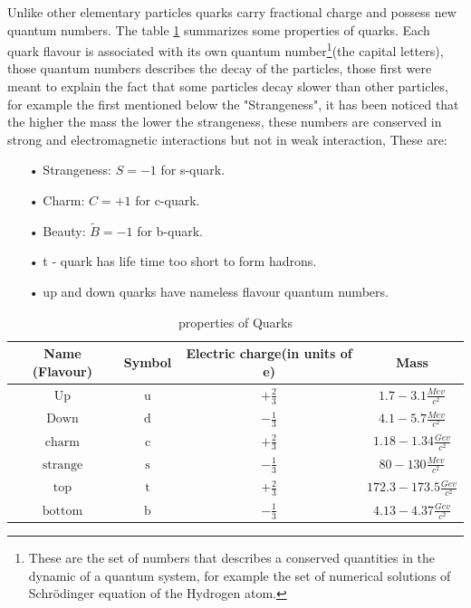 Unlike other elementary particles quarks carry fractional charge and possess new quantum numbers.
The table \ref{table1.1} summarizes
some properties of quarks.
Each quark flavour is associated with its own quantum number\footnote{These are the set of numbers that describes a conserved quantities in the dynamic of a quantum system, for example the set of numerical solutions of Schrödinger equation of the Hydrogen atom.}(the capital letters), those quantum numbers describes the decay of the particles, those first were meant to explain the fact that some particles decay slower than other particles, for example the first mentioned below the "Strangeness", it has been noticed that the higher the mass the lower the strangeness,  these numbers are conserved in strong and electromagnetic interactions but not in weak interaction, 
These are: 
\begin{itemize}
\item[•]Strangeness: $S=-1$ for s-quark.

\item[•]Charm: $C=+1$ for c-quark.

\item[•]Beauty: $\tilde{B}=-1$ for b-quark. 

\item[•] t - quark has life time too short to form hadrons. 
\item[•]up and down quarks have nameless flavour quantum numbers.
\end{itemize} \citep{particle}

\begin{table}
\begin{center} 
 \begin{tabular}{|c|c|c|c|} \hline 
  Name (Flavour) & Symbol & Electric charge(in units of e) & Mass  \\ \hline 
  $\text{Up}$ & $\text{u}$ &$ +\frac{2}{3}$ & $1.7-3.1 \frac{Mev}{c^2}$\\\hline
  $\text{Down}$&$\text{d}$&$-\frac{1}{3}$& $4.1-5.7\frac{Mev}{c^2}$\\\hline
  $\text{charm}$&$\text{c}$&$+\frac{2}{3}$&$1.18-1.34\frac{Gev}{c^2}$\\\hline
  $\text{strange}$&$\text{s}$&$-\frac{1}{3}$&$80-130\frac{Mev}{c^2}$\\\hline
  $\text{top}$&$\text{t}$&$+\frac{2}{3}$&$172.3-173.5\frac{Gev}{c^2}$\\\hline
  $\text{bottom}$&$\text{b}$&$-\frac{1}{3}$&$4.13-4.37\frac{Gev}{c^2}$\\\hline
 \end{tabular}
\caption{properties of Quarks}
\label{table1.1}
\end{center}
\end{table}

